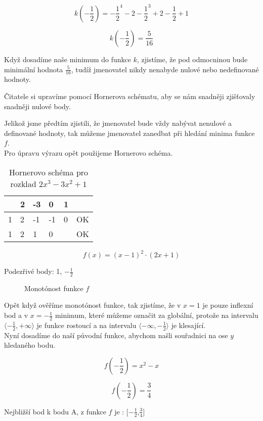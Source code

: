 \begin{displaymath}
k(-\frac{1}{2})=-\frac{1}{2}^4 -2-\frac{1}{2}^3 + 2-\frac{1}{2} + 1
\end{displaymath}

\begin{displaymath}
k(-\frac{1}{2})=\frac{5}{16}
\end{displaymath}

Když dosadíme naše minimum do funkce \(k\), zjistíme, že pod odmocninou bude minimální hodnota \(\frac{5}{16}\), tudíž jmenovatel nikdy nenabyde nulové nebo nedefinované hodnoty.

Čitatele si upravíme pomocí Hornerova schématu, aby se nám snadněji zjišťovaly snadněji nulové body.

Jelikož jsme předtím zjistili, že jmenovatel bude vždy nabývat nenulové a definované hodnoty, 
tak můžeme jmenovatel zanedbat při hledání minima funkce \(f\).\\

Pro úpravu výrazu opět použijeme Hornerovo schéma.

\begin{table}[!h]
\centering
\begin{tabular}{l||l|l|l|l|l}
	 & 2 & -3 &  0 & 1 &    \\ \hline\hline
   1 & 2 & -1 & -1 & 0 & OK \\ \hline
   1 & 2 &  1 &  0 &   & OK \\
\end{tabular}
\caption{Hornerovo schéma pro rozklad $2x^3 - 3x^2 + 1$}
\end{table}

\begin{displaymath}
f(x)=(x-1)^2\cdot (2x +1)
\end{displaymath}

Podezřivé body: 1, \(-\frac{1}{2}\)

\begin{figure}[H]
	\centering
	
	\caption{Monotónost funkce \(f\)}
\end{figure}

Opět když ověříme monotónost funkce, tak zjistíme, že v $x=1$ je pouze inflexní bod a v $x=-\frac{1}{2}$ minimum, 
které můžeme označit za globální, protože na intervalu \(\langle-\frac{1}{2},+\infty\rangle\) je funkce rostoucí 
a na intervalu \(\langle-\infty,-\frac{1}{2}\rangle\) je klesající.\\
Nyní dosadíme do naší původní funkce, abychom našli souřadnici na ose \(y\) hledaného bodu.

\begin{displaymath}
f(-\frac{1}{2})= x^2 - x
\end{displaymath}

\begin{displaymath}
f(-\frac{1}{2})= \frac{3}{4}
\end{displaymath}

Nejbližší bod k bodu A, z funkce \(f\) je : [\(-\frac{1}{2}\),\(\frac{3}{4}\)]
